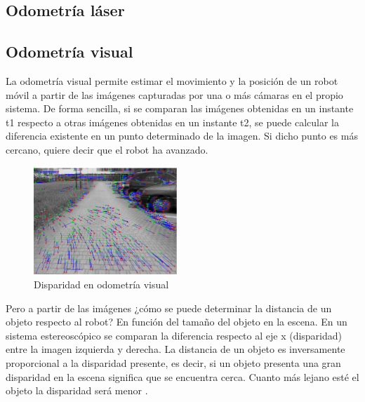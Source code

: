 \subsection{Odometría láser}


\subsection{Odometría visual}
La odometría visual permite estimar el movimiento y la posición de un robot
móvil a partir de las imágenes capturadas por una o más cámaras en el propio
sistema. De forma sencilla, si se comparan las imágenes obtenidas en un instante
t1 respecto a otras imágenes obtenidas en un instante t2, se puede calcular la
diferencia existente en un punto determinado de la imagen. Si dicho punto es más
cercano, quiere decir que el robot ha avanzado.

\begin{figure}
  \vspace{-20pt}
  \begin{center}
    \includegraphics[width=0.48\textwidth]{images/cap2/OdometriaVisual.eps}
  \end{center}
  \vspace{-20pt}
  \caption{Disparidad en odometría visual}
  \vspace{-10pt}
  \label{fig:OdometriaVisual}
\end{figure}

Pero a partir de las imágenes ¿cómo se puede determinar la distancia de un
objeto respecto al robot? En función del tamaño del objeto en la escena. En un
sistema estereoscópico se comparan la diferencia respecto al eje x (disparidad)
entre la imagen izquierda y derecha. La distancia de un objeto es inversamente
proporcional a la disparidad presente, es decir, si un objeto presenta una gran
disparidad en la escena significa que se encuentra cerca. Cuanto más lejano esté
el objeto la disparidad será menor \cite{OdometriaVisual}.

